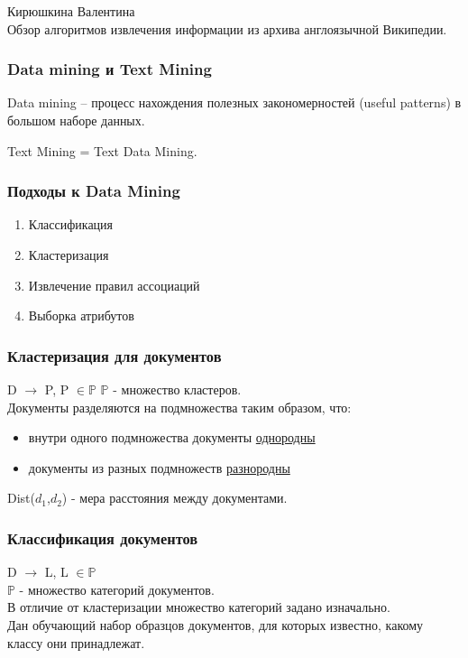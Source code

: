 \documentclass{beamer}
\begin{document}
\begin{frame}
\begin{center}
Кирюшкина Валентина\\
\vspace{1cm}
{\Large Обзор алгоритмов извлечения информации из архива англоязычной Википедии.}
\end{center}
\end{frame}
\begin{frame}
\frametitle{Data mining и Text Mining}
Data mining – процесс нахождения полезных закономерностей (useful patterns)  в большом наборе данных.

\vspace{1cm}

Text Mining = Text Data Mining.
\end{frame}
\begin{frame}
\frametitle{Подходы к Data Mining}
\begin{enumerate}
\item{Классификация}
\item{Кластеризация}
\item{Извлечение правил ассоциаций}
\item{Выборка атрибутов}

\end{enumerate}
\end{frame}
\begin{frame}
\frametitle{Кластеризация для документов}
D $\to$ P, P $\in \mathbb{P}$
\vspace{1cm}
$\mathbb{P}$ - множество кластеров.\\

Документы разделяются на подмножества таким образом, что:

\begin{itemize}
\item{внутри одного подмножества документы \underline{однородны}}
\item{документы из разных подмножеств \underline{разнородны} }
\end{itemize}
\vspace{1cm}
Dist($d_{1}$,$d_{2}$) - мера расстояния между документами.
\end{frame}
\begin{frame}
\frametitle{Классификация документов}
D $\to$ L, L $\in \mathbb{P}$\\
\vspace{1cm}
$\mathbb{P}$ - множество категорий документов.\\
\vspace{1cm}
В отличие от кластеризации множество категорий задано изначально.\\
\vspace{1cm}
Дан обучающий набор образцов документов, для которых известно, какому классу они принадлежат.
\end{frame}
\end{document}
